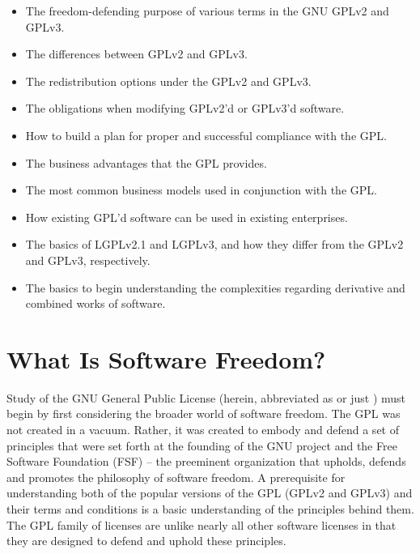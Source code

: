 \begin{itemize}

  \item The freedom-defending purpose of various terms in the GNU GPLv2 and GPLv3.

  \item The differences between GPLv2 and GPLv3.

  \item The redistribution options under the GPLv2 and GPLv3.

  \item The obligations when modifying GPLv2'd or GPLv3'd software.

  \item How to build a plan for proper and successful compliance with the GPL.

  \item The business advantages that the GPL provides.

  \item The most common business models used in conjunction with the GPL.

  \item How existing GPL'd software can be used in existing enterprises.

  \item The basics of LGPLv2.1 and LGPLv3, and how they
    differ from the GPLv2 and GPLv3, respectively.

  \item The basics to begin understanding the complexities regarding
    derivative and combined works of software.
\end{itemize}


\chapter{What Is Software Freedom?}

Study of the GNU General Public License (herein, abbreviated as  or just ) must begin by first considering the broader world
of software freedom. The GPL was not created in a vacuum. Rather, it was
created to embody and defend a set of principles that were set forth at the
founding of the GNU project and the Free Software Foundation (FSF) -- the
preeminent organization that upholds, defends and promotes the philosophy of software
freedom. A prerequisite for understanding both of the popular versions
of the GPL
(GPLv2 and GPLv3) and their terms and conditions is a basic understanding of
the principles behind them.  The GPL family of licenses are unlike nearly all
other software licenses in that they are designed to defend and uphold these
principles.

